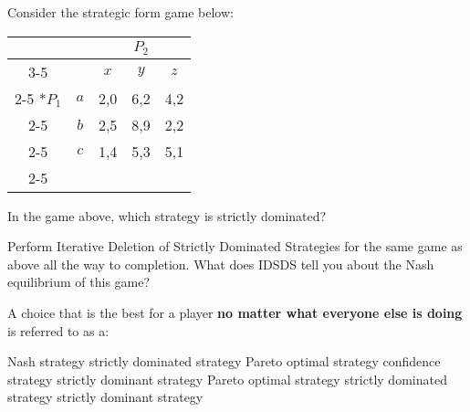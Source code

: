   \begin{question}
  Consider the strategic form game below:
  \begin{table}[h!]
    \begin{center}
    \setlength{\extrarowheight}{2pt}
    \begin{tabular}{*{5}{c|}}
      \multicolumn{2}{c}{} & \multicolumn{3}{c}{$P_2$} \\\cline{3-5}
      \multicolumn{1}{c}{} &     & $x$ & $y$ & $z$ \\\cline{2-5}
      \multirow{3}*{$P_1$}  & $a$ & 2,0 & 6,2 & 4,2 \\\cline{2-5}
                            & $b$ & 2,5 & 8,9 & 2,2 \\\cline{2-5}
                            & $c$ & 1,4 & 5,3 & 5,1 \\\cline{2-5}
    \end{tabular}
    \end{center}
  \end{table}
  
  In the game above, which strategy is strictly dominated?
  
  \begin{tasks}
    \task {}
    \task {}
    \task {}
    \task {}
    \task {}
  \end{tasks}
\end{question}

  \begin{question} 
  Perform Iterative Deletion of Strictly Dominated Strategies for the same game as above all the way to completion.
  What does IDSDS tell you about the Nash equilibrium of this game?
  \begin{tasks}
    \task {}
    \task {}
    \task {}
    \task {}
    \task {}
  \end{tasks}
\end{question}

\begin{question}
  A choice that is the best for a player \textbf{no matter what everyone else is doing}
  is referred to as a:
  \begin{tasks}
    \task \vary
    {Nash strategy}
    {strictly dominated strategy}
    \task \vary
    {Pareto optimal strategy}
    {confidence strategy}
    \task \vary
    {\correct strictly dominant strategy}
    {Pareto optimal strategy}
    \task \vary
    {strictly dominated strategy}
    {\correct strictly dominant strategy}
  \end{tasks}
\end{question}

